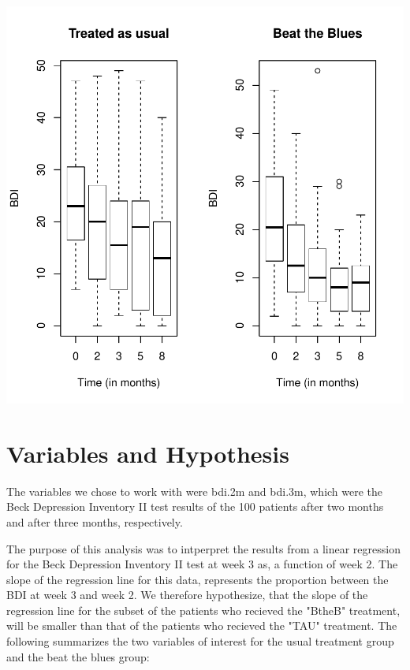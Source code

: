 \documentclass{article}
\begin{document}
\includegraphics{BtheBteam1-002}
\section{Variables and Hypothesis}

The variables we chose to work with were bdi.2m and bdi.3m, which were the Beck Depression Inventory II test results of the 100 patients after two months and after three months, respectively.

The purpose of this analysis was to intperpret the results from a linear regression for the Beck Depression Inventory II test at week 3 as, a function of week 2. The slope of the regression line for this data, represents the proportion between the BDI at week 3 and week 2. We therefore hypothesize, that the slope of the regression line for the subset of the patients who recieved the "BtheB" treatment, will be smaller than that of the patients who recieved the "TAU" treatment. 
\newline
\newline
The following summarizes the two variables of interest for the usual treatment group and the beat the blues group:
\end{document}
